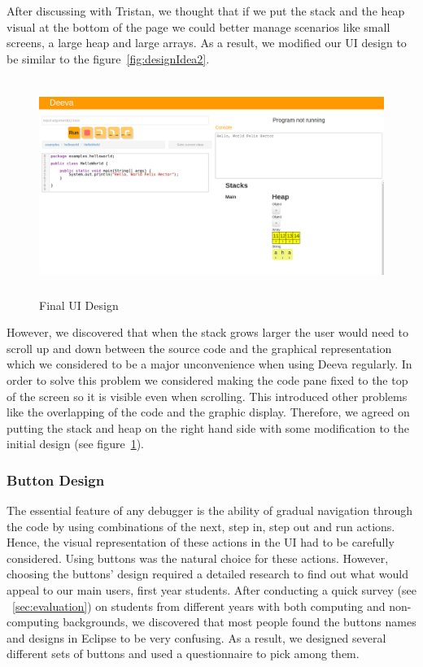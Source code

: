 \documentclass[11pt, a4paper]{article}
\begin{document}
After discussing with Tristan, we thought that if we put the stack and the heap visual at the bottom of the page we could better manage scenarios like small screens, a large heap and large arrays.
As a result, we modified our UI design to be similar to the figure~\ref{fig:designIdea2}.\\
\begin{figure}[h!]
\centering
\includegraphics[height=70mm,width=130mm]{finalDesign.png}
\caption{Final UI Design}
\label{fig:finalDesign}
\end{figure}

However, we discovered that when the stack grows larger the user would need to scroll up and down between the source code and the graphical representation which we considered to be a major unconvenience when using Deeva regularly.
In order to solve this problem we considered making the code pane fixed to the top of the screen so it is visible even when scrolling.
This introduced other problems like the overlapping of the code and the graphic display.
Therefore, we agreed on putting the stack and heap on the right hand side with some modification to the initial design (see figure~\ref{fig:finalDesign}).

\subsubsection{Button Design}
The essential feature of any debugger is the ability of gradual navigation through the code by using combinations of the next, step in, step out and run actions.
Hence, the visual representation of these actions in the UI had to be carefully considered.
Using buttons was the natural choice for these actions. However, choosing the buttons' design required a detailed research to find out what would appeal to our main users, first year students.
After conducting a quick survey (see ~\cref{sec:evaluation}) on students from different years with both computing and non-computing backgrounds, we discovered that most people found the buttons names and designs in Eclipse to be very confusing.
As a result, we designed several different sets of buttons and used a questionnaire to pick among them.
\end{document}
